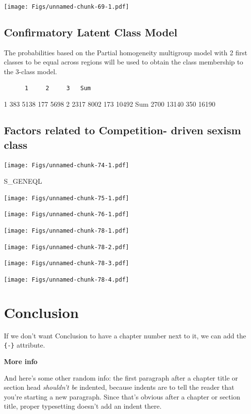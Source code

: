 \documentclass[12pt,twoside]{reedthesis}
\begin{document}
\texttt{[image: Figs/unnamed-chunk-69-1.pdf]}

\hypertarget{confirmatory-latent-class-model}{%
\section{Confirmatory Latent Class Model}\label{confirmatory-latent-class-model}}

The probabilities based on the Partial homogeneity multigroup model with 2 first classes to be equal across regions will be used to obtain the class membership to the 3-class model.
\begin{verbatim}
      1     2     3   Sum
\end{verbatim}
1 383 5138 177 5698
2 2317 8002 173 10492
Sum 2700 13140 350 16190

\hypertarget{factors-related-to-competition--driven-sexism-class}{%
\section{Factors related to Competition- driven sexism class}\label{factors-related-to-competition--driven-sexism-class}}

\texttt{[image: Figs/unnamed-chunk-74-1.pdf]}

S\_GENEQL

\texttt{[image: Figs/unnamed-chunk-75-1.pdf]}

\texttt{[image: Figs/unnamed-chunk-76-1.pdf]}

\texttt{[image: Figs/unnamed-chunk-78-1.pdf]}

\texttt{[image: Figs/unnamed-chunk-78-2.pdf]}

\texttt{[image: Figs/unnamed-chunk-78-3.pdf]}

\texttt{[image: Figs/unnamed-chunk-78-4.pdf]}

\hypertarget{conclusion}{%
\chapter*{Conclusion}\label{conclusion}}

If we don't want Conclusion to have a chapter number next to it, we can add the \texttt{\{-\}} attribute.

\textbf{More info}

And here's some other random info: the first paragraph after a chapter title or section head \emph{shouldn't be} indented, because indents are to tell the reader that you're starting a new paragraph. Since that's obvious after a chapter or section title, proper typesetting doesn't add an indent there.
\end{document}
